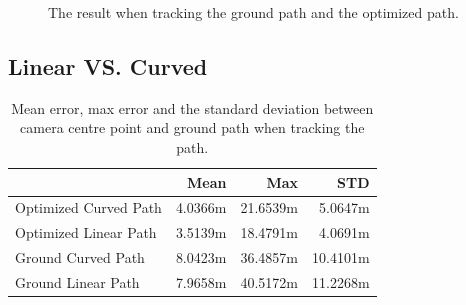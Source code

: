 \begin{figure}
	\caption{The result when tracking the ground path and the optimized path.}
	\label{fig:cur_sim_res}
\end{figure}


\subsection{Linear VS. Curved}

\begin{table}
\centering
\begin{tabular}{l r r r}
    \hline
    & Mean & Max  & STD \\
    \hline
    Optimized Curved Path & 4.0366m & 21.6539m & 5.0647m \\
    Optimized Linear Path & 3.5139m & 18.4791m & 4.0691m \\
    Ground Curved Path & 8.0423m & 36.4857m & 10.4101m \\
    Ground Linear Path & 7.9658m & 40.5172m & 11.2268m \\
    \hline
\end{tabular}
\caption{Mean error, max error and the standard deviation between camera centre point and ground path when tracking the path.}
\label{tab:sim_easy}
\end{table}

